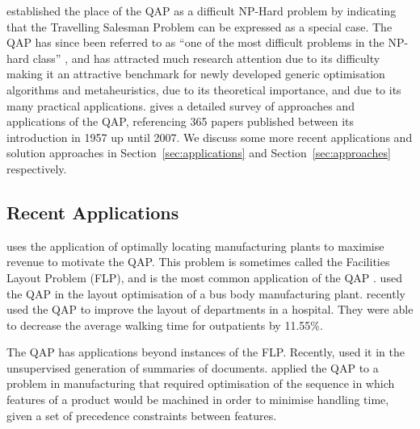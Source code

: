 \citeauthor{Koopmans:1957gf} established the place of the QAP as a difficult NP-Hard problem by indicating that the Travelling Salesman Problem can be expressed as a special case. The QAP has since been referred to as ``one of the most difficult problems in the NP-hard class'' \citep{Loiola:2007jk}, and has attracted much research attention due to its difficulty making it an attractive benchmark for newly developed generic optimisation algorithms and metaheuristics, due to its theoretical importance, and due to its many practical applications.
\citet{Loiola:2007jk} gives a detailed survey of approaches and applications of the QAP, referencing 365 papers published between its introduction in 1957 up until 2007. We discuss some more recent applications and solution approaches in Section~\ref{sec:applications} and Section~\ref{sec:approaches} respectively.

\subsection{Recent Applications} {
    \label{sec:applications}

	\citeauthor{Koopmans:1957gf} uses the application of optimally locating manufacturing plants to maximise revenue to motivate the QAP. This problem is sometimes called the Facilities Layout Problem (FLP), and is the most common application of the QAP \citep{Loiola:2007jk}.
	\citet{Samanta:2015hk} used the QAP in the layout optimisation of a bus body manufacturing plant.
	\citet{XiongfengFeng:2015jo} recently used the QAP to improve the layout of departments in a hospital. They were able to decrease the average walking time for outpatients by 11.55\%.

	The QAP has applications beyond instances of the FLP.
	Recently, \citep{Alguliyev:2015jw} used it in the unsupervised generation of summaries of documents.
	\citet{Azab:2015eq} applied the QAP to a problem in manufacturing that required optimisation of the sequence in which features of a product would be machined in order to minimise handling time, given a set of precedence constraints between features.





}

